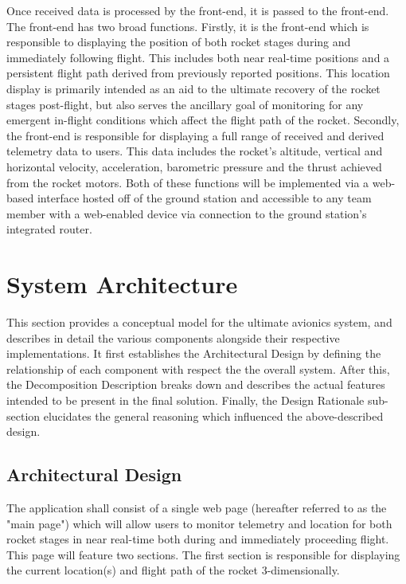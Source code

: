 \documentclass[onecolumn, draftclsnofoot,10pt, compsoc]{IEEEtran}
\begin{document}
Once received data is processed by the front-end, it is passed to the front-end.
The front-end has two broad functions.
Firstly, it is the front-end which is responsible to displaying the position of both rocket stages during and immediately following flight.
This includes both near real-time positions and a persistent flight path derived from previously reported positions.
This location display is primarily intended as an aid to the ultimate recovery of the rocket stages post-flight, but also serves the ancillary goal of monitoring for any emergent in-flight conditions which affect the flight path of the rocket.
Secondly, the front-end is responsible for displaying a full range of received and derived telemetry data to users.
This data includes the rocket’s altitude, vertical and horizontal velocity, acceleration, barometric pressure and the thrust achieved from the rocket motors.
Both of these functions will be implemented via a web-based interface hosted off of the ground station and accessible to any team member with a web-enabled device via connection to the ground station's integrated router. 


\section{System Architecture}
This section provides a conceptual model for the ultimate avionics system, and describes in detail the various components alongside their respective implementations.
It first establishes the Architectural Design by defining the relationship of each component with respect the the overall system.
After this, the Decomposition Description breaks down and describes the actual features intended to be present in the final solution.
Finally, the Design Rationale sub-section elucidates the general reasoning which influenced the above-described design.

\subsection{Architectural Design}


The application shall consist of a single web page (hereafter referred to as the "main page") which will allow users to monitor telemetry and location for both rocket stages in near real-time both during and immediately proceeding flight.
This page will feature two sections.
The first section is responsible for displaying the current location(s) and flight path of the rocket 3-dimensionally.
\end{document}
